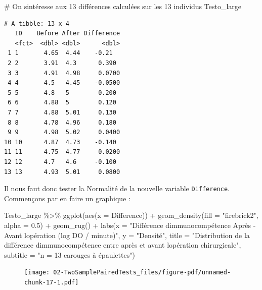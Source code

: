 \documentclass[
  a4paper,
  DIV=11,
  numbers=noendperiod,
  oneside]{scrreprt}
\newenvironment{Shaded}{}{}
\newcommand{\AttributeTok}[1]{\textcolor[rgb]{0.84,0.23,0.29}{#1}}
\newcommand{\CommentTok}[1]{\textcolor[rgb]{0.42,0.45,0.49}{#1}}
\newcommand{\FloatTok}[1]{\textcolor[rgb]{0.00,0.36,0.77}{#1}}
\newcommand{\FunctionTok}[1]{\textcolor[rgb]{0.44,0.26,0.76}{#1}}
\newcommand{\NormalTok}[1]{\textcolor[rgb]{0.14,0.16,0.18}{#1}}
\newcommand{\SpecialCharTok}[1]{\textcolor[rgb]{0.00,0.36,0.77}{#1}}
\newcommand{\StringTok}[1]{\textcolor[rgb]{0.01,0.18,0.38}{#1}}
\begin{document}
\begin{Shaded}
\begin{Highlighting}[]
\CommentTok{\# On s\textquotesingle{}intéresse aux 13 différences calculées sur les 13 individus}
\NormalTok{Testo\_large }
\end{Highlighting}
\end{Shaded}

\begin{verbatim}
# A tibble: 13 x 4
   ID    Before After Difference
   <fct>  <dbl> <dbl>      <dbl>
 1 1       4.65  4.44    -0.21  
 2 2       3.91  4.3      0.390 
 3 3       4.91  4.98     0.0700
 4 4       4.5   4.45    -0.0500
 5 5       4.8   5        0.200 
 6 6       4.88  5        0.120 
 7 7       4.88  5.01     0.130 
 8 8       4.78  4.96     0.180 
 9 9       4.98  5.02     0.0400
10 10      4.87  4.73    -0.140 
11 11      4.75  4.77     0.0200
12 12      4.7   4.6     -0.100 
13 13      4.93  5.01     0.0800
\end{verbatim}

Il nous faut donc tester la Normalité de la nouvelle variable
\texttt{Difference}. Commençons par en faire un graphique :

\begin{Shaded}
\begin{Highlighting}[]
\NormalTok{Testo\_large }\SpecialCharTok{\%\textgreater{}\%}
  \FunctionTok{ggplot}\NormalTok{(}\FunctionTok{aes}\NormalTok{(}\AttributeTok{x =}\NormalTok{ Difference)) }\SpecialCharTok{+}
  \FunctionTok{geom\_density}\NormalTok{(}\AttributeTok{fill =} \StringTok{"firebrick2"}\NormalTok{, }\AttributeTok{alpha =} \FloatTok{0.5}\NormalTok{) }\SpecialCharTok{+}
  \FunctionTok{geom\_rug}\NormalTok{() }\SpecialCharTok{+}
  \FunctionTok{labs}\NormalTok{(}\AttributeTok{x =} \StringTok{"Différence d\textquotesingle{}immunocompétence \textquotesingle{}Après {-} Avant\textquotesingle{} l\textquotesingle{}opération (log DO / minute)"}\NormalTok{,}
       \AttributeTok{y =} \StringTok{"Densité"}\NormalTok{,}
       \AttributeTok{title =} \StringTok{"Distribution de la différence d\textquotesingle{}immunocompétence entre après et avant l\textquotesingle{}opération chirurgicale"}\NormalTok{,}
       \AttributeTok{subtitle =} \StringTok{"n = 13 carouges à épaulettes"}\NormalTok{)}
\end{Highlighting}
\end{Shaded}

\begin{figure}[H]

{\centering \texttt{[image: 02-TwoSamplePairedTests\_files/figure-pdf/unnamed-chunk-17-1.pdf]}

}

\end{figure}
\end{document}
